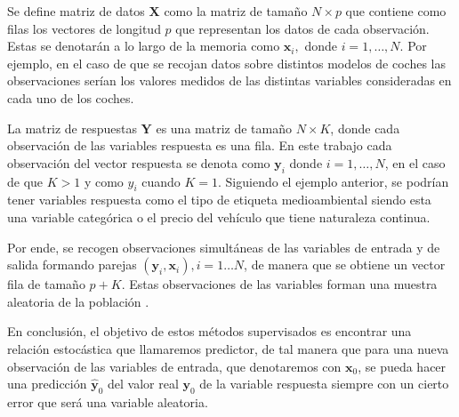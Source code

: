 \begin{defi}
Se define matriz de datos $\textbf{X}$ como la matriz de tamaño $N\times p$ que contiene como filas los vectores de longitud $p$ que representan los datos de cada observación. Estas se denotarán a lo largo de la memoria como $\textbf{x}_i,$ donde $i=1,\ldots, N$. Por ejemplo, en el caso de que se recojan datos sobre distintos modelos de coches las observaciones serían los valores medidos de las distintas variables consideradas en cada uno de los coches. 
\end{defi}

\begin{defi}
La matriz de respuestas $\textbf{Y}$ es una matriz de tamaño $N \times K$, donde cada observación de las variables respuesta es una fila. En este trabajo cada observación del vector respuesta se denota como $\mathbf{y}_i$ donde $i=1,\ldots, N$, en el caso de que $K>1$ y como $y_i$ cuando $K=1$. Siguiendo el ejemplo anterior, se podrían tener variables respuesta como el tipo de etiqueta medioambiental siendo esta una variable categórica o el precio del vehículo que tiene naturaleza continua.
\end{defi}

\noindent Por ende, se recogen observaciones simultáneas de las variables de entrada y de salida formando parejas $(\mathbf{y}_i,\textbf{x}_i), i=1\ldots N$, de manera que se obtiene un vector fila de tamaño $p+K$. Estas observaciones de las variables forman una muestra aleatoria de la población .


\noindent En conclusión, el objetivo de estos métodos supervisados es encontrar una relación estocástica que llamaremos predictor, de tal manera que para una nueva observación de las variables de entrada, que denotaremos con $\textbf{x}_0$, se pueda hacer una predicción $\hat{\textbf{y}}_0$ del valor real $\textbf{y}_0$ de la variable respuesta siempre con un cierto error que será una variable  aleatoria. 
 
